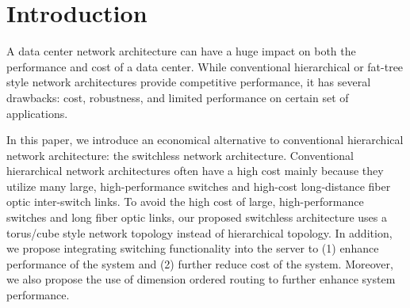 \section{Introduction}
\label{sec:intro}
A data center network architecture can have a huge impact on both the performance and cost of a data center. While conventional hierarchical or fat-tree style network architectures provide competitive performance, it has several drawbacks: cost, robustness, and limited performance on certain set of applications. 

In this paper, we introduce an economical alternative to conventional hierarchical network architecture: the switchless network architecture. Conventional hierarchical network architectures often have a high cost mainly because they utilize many large, high-performance switches and high-cost long-distance fiber optic inter-switch links. To avoid the high cost of large, high-performance switches and long fiber optic links, our proposed switchless architecture uses a torus/cube style network topology instead of hierarchical topology. In addition, we propose integrating switching functionality into the server to (1) enhance performance of the system and (2) further reduce cost of the system. Moreover, we also propose the use of dimension ordered routing to further enhance system performance.
